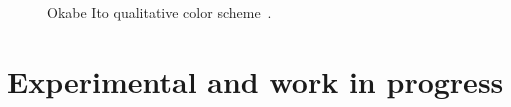 \documentclass{scrartcl}
\begin{document}
\begin{figure}[ht]
    \centering
    \caption{Okabe Ito qualitative color scheme~\cite{Ichihara_2008,Wong_2011}.}
    \label{fig:OI}
\end{figure}


\section{Experimental and work in progress}

\let\oldcolor\color

\newcommand\normalvision{%
    \protect\renewcommand\color[1]{\oldcolor{##1}}%
}

\newcommand\protanopia{%
    \protect\renewcommand\color[1]{%
        \extractcolorspecs{##1}{\modelspec}{\colorspec}%
        \tikzmath{
            \r = array({\colorspec},0);
            \g = array({\colorspec},1);
            \b = array({\colorspec},2);
            \rp = pow(0.06425 + 0.677*pow(\g, 2.2) + 0.2802*pow(\r, 2.2), 1./2.2);
            \gp = pow(0.06425 + 0.677*pow(\g, 2.2) + 0.2802*pow(\r, 2.2), 1./2.2);
            \bp = pow(0.06425 + 0.95724*pow(\b, 2.2) + 0.02138*pow(\g, 2.2) - 0.02138*pow(\r, 2.2), 1./2.2);
        }%
        \oldcolor[rgb]{\rp,\gp,\bp}%
    }%
}

\newcommand\deuteranopia{%
    \protect\renewcommand\color[1]{%
        \extractcolorspecs{##1}{\modelspec}{\colorspec}%
        \tikzmath{
            \r = array({\colorspec},0);
            \g = array({\colorspec},1);
            \b = array({\colorspec},2);
            \rp = pow(0.01194 + 0.8806*pow(\g, 2.2) + 0.1115*pow(\r, 2.2), 1./2.2);
            \gp = pow(0.01194 + 0.8806*pow(\g, 2.2) + 0.1115*pow(\r, 2.2), 1./2.2);
            \bp = pow(0.01194 + 0.992052*pow(\b, 2.2) - 0.003974*pow(\g, 2.2) + 0.003974*pow(\r, 2.2), 1./2.2);
        }%
        \oldcolor[rgb]{\rp,\gp,\bp}%
    }%
}
\end{document}
